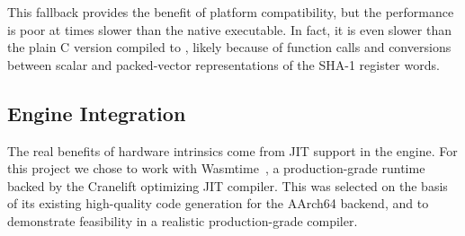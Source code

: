 This fallback provides the benefit of platform compatibility, but the
performance is poor at \MetricGenericWasmtimeBaselineDivNative times slower than
the native executable. In fact, it is even
\MetricGenericWasmtimeBaselineDivWasmtimeBaselineGeneric slower than the plain C
version compiled to \wasm, likely because of function calls and conversions
between scalar and packed-vector representations of the SHA-1 register words.

\subsection{Engine Integration}
\label{sec:engine}

The real benefits of hardware intrinsics come from JIT support in the \wasm
engine. For this project we chose to work with Wasmtime~\cite{wasmtime}, a
production-grade \wasm runtime backed by the Cranelift optimizing JIT compiler.
This was selected on the basis of its existing high-quality code generation for
the AArch64 backend, and to demonstrate feasibility in a realistic
production-grade compiler.


